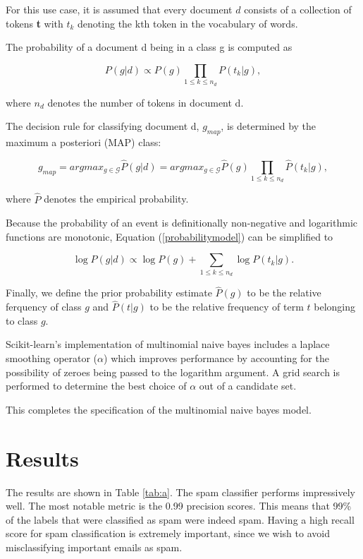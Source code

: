 \documentclass[10pt,a4paper]{article}
\begin{document}
For this use case, it is assumed that every document $d$ consists of a collection of tokens \textbf{t} with $t_{k}$ denoting the kth token in the vocabulary of words.

The probability of a document d being in a class g is computed as

\begin{equation} \label{probabilitymodel}
P(g|d) \propto P(g) \prod_{1 \leq k \leq n_{d}}P(t_{k}|g),
\end{equation}

where $n_{d}$ denotes the number of tokens in document d.

The decision rule for classifying document d, $g_{map}$, is determined by the maximum a posteriori (MAP) class: 

\begin{equation}
g_{map} = arg max_{g \in \mathcal{G}}\hat{P}(g|d) = arg max_{g \in \mathcal{G}}\hat{P}(g)\prod_{1\leq k \leq n_{d}}\hat{P}(t_{k}|g),
\end{equation}

where $\hat{P}$ denotes the empirical probability. 

Because the probability of an event is definitionally non-negative and logarithmic functions are monotonic, Equation (\ref{probabilitymodel}) can be simplified to

\begin{equation}
\log{P(g|d)} \propto \log{P(g)} + \sum_{1\leq k\leq n_{d}}{\log{P(t_{k}|g)}}.
\end{equation}

Finally, we define the prior probability estimate $\hat{P}(g)$ to be the relative ferquency of class $g$ and $\hat{P}(t|g)$ to be the relative frequency of term $t$ belonging to class $g$. 

Scikit-learn's implementation of multinomial naive bayes includes a laplace smoothing operator ($\alpha$) which improves performance by accounting for the possibility of zeroes being passed to the logarithm argument. A grid search is performed to determine the best choice of $\alpha$ out of a candidate set. 


This completes the specification of the multinomial naive bayes model. 


\section{Results}
 The results are shown in Table \ref{tab:a}. The spam classifier performs impressively well. The most notable metric is the 0.99 precision scores. This means that 99\% of the labels that were classified as spam were indeed spam. Having a high recall score for spam classification is extremely important, since we wish to avoid misclassifying important emails as spam. 
\end{document}
